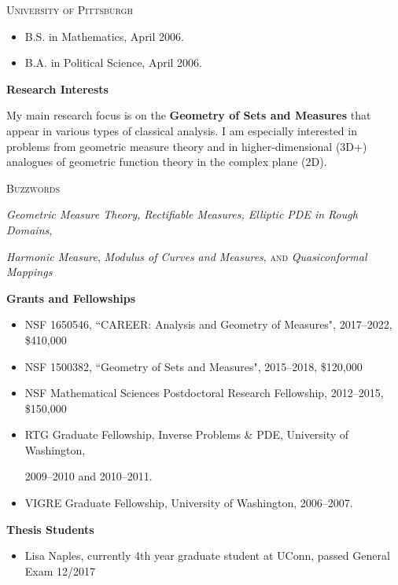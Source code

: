 \documentclass[12pt]{amsart}
\newcommand{\ssection}[1]{\noindent\textbf{#1}\vspace{.2cm}}
\newcommand{\esection}{\vspace{.3cm}}
\newcommand{\svs}{\vspace{.1cm}}
\begin{document}
\noindent \textsc{University of Pittsburgh} \begin{itemize}
\item B.S. in Mathematics, April 2006.
\item B.A. in Political Science, April 2006.
\end{itemize}

\esection

\vfill

\ssection{Research Interests}

\noindent My main research focus is on the \textbf{Geometry of Sets and Measures} that appear in various types of classical analysis. I am especially interested in problems from geometric measure theory and in higher-dimensional (3D+) analogues of geometric function theory in the complex plane (2D). \svs

\noindent\textsc{Buzzwords} \svs

\noindent\emph{Geometric Measure Theory, Rectifiable Measures, Elliptic PDE in Rough Domains},

\hfill \emph{Harmonic Measure}, \emph{Modulus of Curves and Measures}, \textsc{and} \emph{Quasiconformal Mappings}

\esection

\vfill

\ssection{Grants and Fellowships}

\begin{itemize}
\item NSF 1650546, ``CAREER: Analysis and Geometry of Measures", 2017--2022, \$410,000\svs
\item NSF 1500382, ``Geometry of Sets and Measures", 2015--2018, \$120,000 \svs
\item NSF Mathematical Sciences Postdoctoral Research Fellowship, 2012--2015, \$150,000 \svs
\item RTG Graduate Fellowship, Inverse Problems \& PDE, University of Washington,\par 2009--2010 and 2010--2011. \svs
\item VIGRE Graduate Fellowship, University of Washington, 2006--2007.
\end{itemize}

\esection

\newpage\ssection{Thesis Students}

\begin{itemize}

\item Lisa Naples, currently 4th year graduate student at UConn, passed General Exam 12/2017

\end{itemize}
\end{document}
